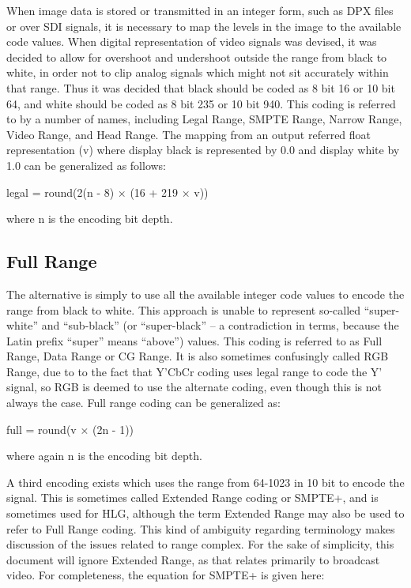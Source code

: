 When image data is stored or transmitted in an integer form, such as DPX files or over SDI signals, it is necessary to map the levels in the image to the available code values. When digital representation of video signals was devised, it was decided to allow for overshoot and undershoot outside the range from black to white, in order not to clip analog signals which might not sit accurately within that range. Thus it was decided that black should be coded as 8 bit 16 or 10 bit 64, and white should be coded as 8 bit 235 or 10 bit 940. This coding is referred to by a number of names, including Legal Range, SMPTE Range, Narrow Range, Video Range, and Head Range. The mapping from an output referred float representation (v) where display black is represented by 0.0 and display white by 1.0 can be generalized as follows:

	legal = round(2(n - 8) × (16 + 219 × v))

where n is the encoding bit depth.

\subsection{Full Range}

The alternative is simply to use all the available integer code values to encode the range from black to white. This approach is unable to represent so-called “super-white” and “sub-black” (or “super-black” – a contradiction in terms, because the Latin prefix “super” means “above”) values. This coding is referred to as Full Range, Data Range or CG Range. It is also sometimes confusingly called RGB Range, due to to the fact that Y'CbCr coding uses legal range to code the Y' signal, so RGB is deemed to use the alternate coding, even though this is not always the case. Full range coding can be generalized as:

	full = round(v × (2n - 1))

where again n is the encoding bit depth.

A third encoding exists which uses the range from 64-1023 in 10 bit to encode the signal. This is sometimes called Extended Range coding or SMPTE+, and is sometimes used for HLG, although the term Extended Range may also be used to refer to Full Range coding. This kind of ambiguity regarding terminology makes discussion of the issues related to range complex. For the sake of simplicity, this document will ignore Extended Range, as that relates primarily to broadcast video. For completeness, the equation for SMPTE+ is given here:

